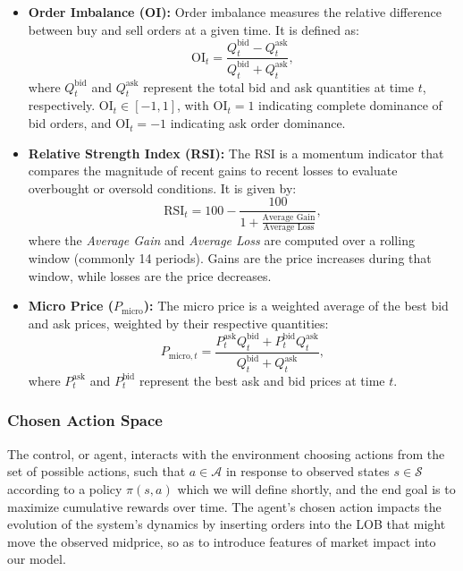 \begin{itemize}
	\item \textbf{Order Imbalance (OI):} Order imbalance measures the relative difference between buy and sell orders at a given time. It is defined as:
	$$
	\text{OI}_t = \frac{Q_t^{\text{bid}} - Q_t^{\text{ask}}}{Q_t^{\text{bid}} + Q_t^{\text{ask}}},
	$$
	where \( Q_t^{\text{bid}} \) and \( Q_t^{\text{ask}} \) represent the total bid and ask quantities at time \( t \), respectively. \( \text{OI}_t \in [-1, 1] \), with \( \text{OI}_t = 1 \) indicating complete dominance of bid orders, and \( \text{OI}_t = -1 \) indicating ask order dominance.
	
	\item \textbf{Relative Strength Index (RSI):} The RSI is a momentum indicator that compares the magnitude of recent gains to recent losses to evaluate overbought or oversold conditions. It is given by:
	$$
	\text{RSI}_t = 100 - \frac{100}{1 + \frac{\text{Average Gain}}{\text{Average Loss}}},
	$$
	where the \textit{Average Gain} and \textit{Average Loss} are computed over a rolling window (commonly 14 periods). Gains are the price increases during that window, while losses are the price decreases.

	\item \textbf{Micro Price (\( P_{\text{micro}} \)):} The micro price is a weighted average of the best bid and ask prices, weighted by their respective quantities:
	$$
	P_{\text{micro},t} = \frac{P_t^{\text{ask}} Q_t^{\text{bid}} + P_t^{\text{bid}} Q_t^{\text{ask}}}{Q_t^{\text{bid}} + Q_t^{\text{ask}}},
	$$
	where \( P_t^{\text{ask}} \) and \( P_t^{\text{bid}} \) represent the best ask and bid prices at time \( t \).

\end{itemize}

\subsubsection{Chosen Action Space}

The control, or agent, interacts with the environment choosing actions from the set of possible actions, such that $a \in \mathcal{A}$ in response to observed states $s \in \mathcal{S}$ according to a policy $\pi (s, a)$ which we will define shortly, and the end goal is to maximize cumulative rewards over time. The agent's chosen action impacts the evolution of the system's dynamics by inserting orders into the LOB that might move the observed midprice, so as to introduce features of market impact into our model.

